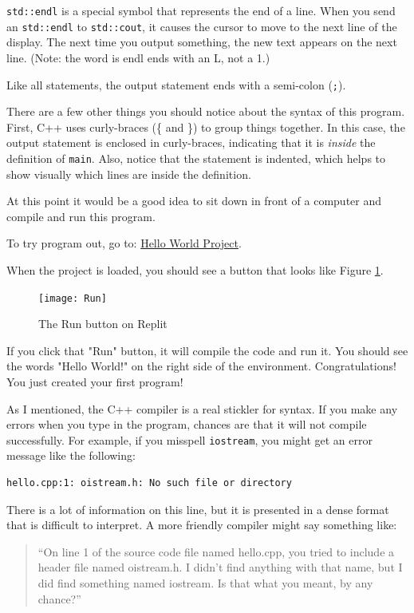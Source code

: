 
{\tt std::endl} is a special symbol that represents the end of a
line.  When you send an {\tt std::endl} to {\tt std::cout}, it causes the
cursor to move to the next line of the display.
The next time you output something, the new text appears
on the next line. (Note: the word is endl ends with an L, not a 1.)

Like all statements, the output statement ends with a
semi-colon ({\tt ;}).

There are a few other things you should notice about the syntax of
this program.  First, C++ uses curly-braces (\{ and
\}) to group things together.  In this case, the output statement
is enclosed in curly-braces, indicating that it is {\em inside} the
definition of {\tt main}.  Also, notice that the statement is
indented, which helps to show visually which lines are inside the
definition.

At this point it would be a good idea to sit down in front of
a computer and compile and run this program.  

To try program out, go to:
\href{https://replit.com/@lpatacch/helloWorld#hello.cpp}{Hello World Project}.

When the project is loaded, you should see a button that looks like Figure \ref{fig:Run}.
\smallskip
\begin{figure}
    \centering
    \texttt{[image: Run]}
    \caption{The Run button on Replit}
    \label{fig:Run}
\end{figure}

If you click that "Run" button, it will compile the code and run it. You should see the words "Hello World!" on the right side of the environment. Congratulations! You just created your first program!

As I mentioned, the C++ compiler is a real stickler for syntax.
If you make any errors when you type in the program, chances
are that it will not compile successfully.  For example, if
you misspell {\tt iostream}, you might get an error message like
the following:

\begin{verbatim}
hello.cpp:1: oistream.h: No such file or directory
\end{verbatim}
%
There is a lot of information on this line, but it is presented
in a dense format that is difficult to interpret.  A more friendly
compiler might say something like:

\begin{quote}
``On line 1 of the source code file named hello.cpp, you tried to
include a header file named oistream.h.  I didn't find anything
with that name, but I did find something named iostream.  Is
that what you meant, by any chance?''
\end{quote}

